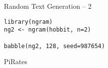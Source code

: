 \begin{frame}[fragile]{Random Text Generation -- 2}

\begin{verbatim}
library(ngram)
ng2 <- ngram(hobbit, n=2)

babble(ng2, 128, seed=987654)
\end{verbatim}

\end{frame}

\begin{frame}{PiRates}


\end{frame}
